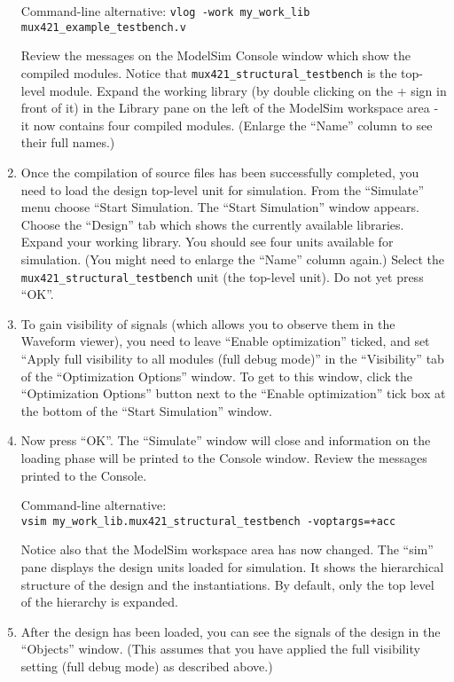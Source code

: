 \documentclass[a4paper,11pt]{article}
\begin{document}
\begin{enumerate}
  Command-line alternative: \verb#vlog -work my_work_lib mux421_example_testbench.v#
  
  Review the messages on the ModelSim Console window which show the compiled
  modules. Notice that \verb#mux421_structural_testbench# is the top-level
  module. Expand the working library (by double clicking on the + sign in front
  of it) in the Library pane on the left of the ModelSim workspace area - it
  now contains four compiled modules. (Enlarge the ``Name'' column to see their
  full names.)
  
\item Once the compilation of source files has been successfully completed, you
  need to load the design top-level unit for simulation. From the ``Simulate''
  menu choose ``Start Simulation. The ``Start Simulation'' window appears.
  Choose the ``Design'' tab which shows the currently available libraries.
  Expand your working library. You should see four units available for
  simulation. (You might need to enlarge the ``Name'' column again.) Select the
  \verb#mux421_structural_testbench# unit (the top-level unit). Do not yet press ``OK''.

\item To gain visibility of signals (which allows you to observe them in the
  Waveform viewer), you need to leave ``Enable optimization'' ticked, and set
  ``Apply full visibility to all modules (full debug mode)'' in the
  ``Visibility'' tab of the ``Optimization Options'' window. To get to this
  window, click the ``Optimization Options'' button next to the ``Enable
  optimization'' tick box at the bottom of the ``Start Simulation'' window.

\item Now press ``OK''. The ``Simulate'' window will close and information on
  the loading phase will be printed to the Console window. Review the messages
  printed to the Console.

  Command-line alternative: \\
  \verb#vsim my_work_lib.mux421_structural_testbench -voptargs=+acc#
  
  Notice also that the ModelSim workspace area has now changed. The ``sim''
  pane displays the design units loaded for simulation. It shows the
  hierarchical structure of the design and the instantiations. By default, only
  the top level of the hierarchy is expanded.
  
\item After the design has been loaded, you can see the signals of the design
  in the ``Objects'' window. (This assumes that you have applied the full
  visibility setting (full debug mode) as described above.)


\end{enumerate}
\end{document}
